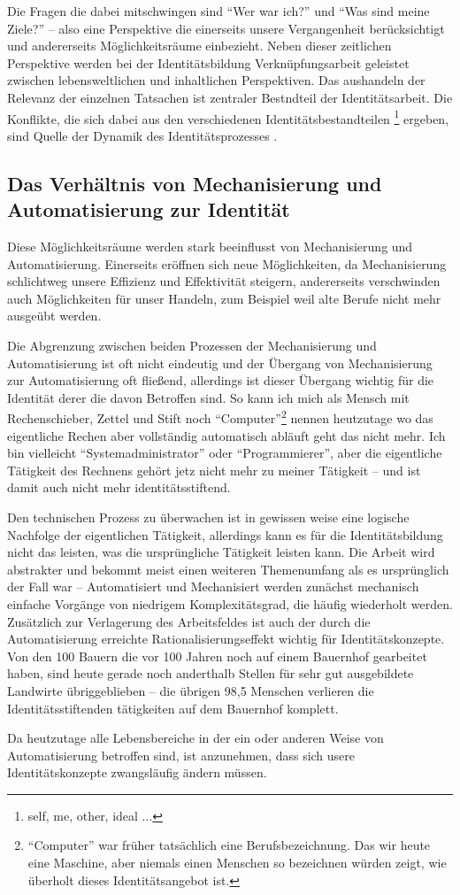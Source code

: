 Die Fragen die dabei mitschwingen sind \enquote{Wer war ich?} und \enquote{Was sind meine Ziele?} – also eine Perspektive die einerseits unsere Vergangenheit berücksichtigt und andererseits Möglichkeitsräume einbezieht.
Neben dieser zeitlichen Perspektive werden bei der Identitätsbildung Verknüpfungsarbeit geleistet zwischen lebensweltlichen und inhaltlichen Perspektiven.
Das aushandeln der Relevanz der einzelnen Tatsachen ist zentraler Bestndteil der Identitätsarbeit.
Die Konflikte, die sich dabei aus den verschiedenen Identitätsbestandteilen \footnote{self, me, other, ideal ...} ergeben, sind Quelle der Dynamik des Identitätsprozesses \parencite{keupp}.

\subsection {Das Verhältnis von Mechanisierung und Automatisierung zur Identität}

Diese Möglichkeitsräume werden stark beeinflusst von Mechanisierung und Automatisierung.
Einerseits eröffnen sich neue Möglichkeiten, da Mechanisierung schlichtweg unsere Effizienz und Effektivität steigern, andererseits verschwinden auch Möglichkeiten für unser Handeln, zum Beispiel weil alte Berufe nicht mehr ausgeübt werden.

Die Abgrenzung zwischen beiden Prozessen der Mechanisierung und Automatisierung ist oft nicht eindeutig und der Übergang von Mechanisierung zur Automatisierung oft fließend, allerdings ist dieser Übergang wichtig für die Identität derer die davon Betroffen sind.
So kann ich mich als Mensch mit Rechenschieber, Zettel und Stift noch \enquote{Computer}\footnote{\enquote{Computer} war früher tatsächlich eine Berufsbezeichnung. Das wir heute  eine Maschine, aber niemals einen Menschen so bezeichnen würden zeigt, wie überholt dieses Identitätsangebot ist.} nennen heutzutage wo das eigentliche Rechen aber vollständig automatisch abläuft geht das nicht mehr.
Ich bin vielleicht \enquote{Systemadministrator} oder \enquote{Programmierer}, aber die eigentliche Tätigkeit des Rechnens gehört jetz nicht mehr zu meiner Tätigkeit – und ist damit auch nicht mehr identitätsstiftend.

Den technischen Prozess zu überwachen ist in gewissen weise eine logische Nachfolge der eigentlichen Tätigkeit, allerdings kann es für die Identitätsbildung nicht das leisten, was die ursprüngliche Tätigkeit leisten kann.
Die Arbeit wird abstrakter und bekommt meist einen weiteren Themenumfang als es ursprünglich der Fall war \parencite{ulrich} – Automatisiert und Mechanisiert werden zunächst mechanisch einfache Vorgänge von niedrigem Komplexitätsgrad, die häufig wiederholt werden.
Zusätzlich zur Verlagerung des Arbeitsfeldes ist auch der durch die Automatisierung erreichte Rationalisierungseffekt wichtig für Identitätskonzepte.
Von den 100 Bauern die vor 100 Jahren noch auf einem Bauernhof gearbeitet haben, sind heute gerade noch anderthalb Stellen für sehr gut ausgebildete Landwirte übriggeblieben \parencite{arbeitsfrei} – die übrigen 98,5 Menschen verlieren die Identitätsstiftenden tätigkeiten auf dem Bauernhof komplett.

Da heutzutage alle Lebensbereiche in der ein oder anderen Weise von Automatisierung betroffen sind, ist anzunehmen, dass sich usere Identitätskonzepte zwangsläufig ändern müssen.

